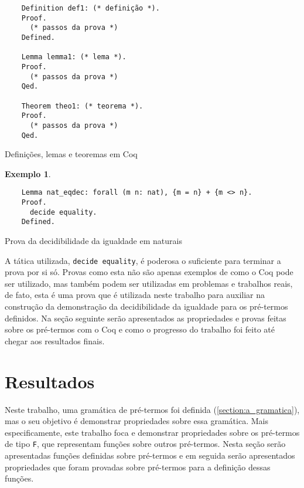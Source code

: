 \documentclass{article}
\newenvironment{codigo}{\captionsetup{type=listing}}{}
\newtheorem{exemplo}{Exemplo}
\begin{document}
\begin{codigo}
\begin{verbatim}
	Definition def1: (* definição *).
	Proof.
	  (* passos da prova *)
	Defined.

	Lemma lemma1: (* lema *).
	Proof.
	  (* passos da prova *)
	Qed.

	Theorem theo1: (* teorema *).
	Proof.
	  (* passos da prova *)
	Qed.
\end{verbatim}
\caption{Definições, lemas e teoremas em Coq}
\label{codigo:provas}
\end{codigo}

\begin{exemplo}
	\label{exemplo:decidibilidade_naturais}
\end{exemplo}
\begin{codigo}
\begin{verbatim}
	Lemma nat_eqdec: forall (m n: nat), {m = n} + {m <> n}.
	Proof.
	  decide equality.
	Defined.
\end{verbatim}
\caption{Prova da decidibilidade da igualdade em naturais}
\label{codigo:decidibilidade_naturais}
\end{codigo}

A tática utilizada, \texttt{decide equality}, é poderosa o suficiente para terminar a prova por si só.  Provas como esta não são apenas exemplos de como o Coq pode ser utilizado, mas também podem ser utilizadas em problemas e trabalhos reais, de fato, esta é uma prova que é utilizada neste trabalho para auxiliar na construção da demonstração da decidibilidade da igualdade para os pré-termos definidos. Na seção seguinte serão apresentados as propriedades e provas feitas sobre os pré-termos com o Coq e como o progresso do trabalho foi feito até chegar aos resultados finais.

\section{Resultados}
\label{section:resultados}

Neste trabalho, uma gramática de pré-termos foi definida (\ref{section:a_gramatica}), mas o seu objetivo é demonstrar propriedades sobre essa gramática. Mais especificamente, este trabalho foca e demonstrar propriedades sobre os pré-termos de tipo \texttt{F}, que representam funções sobre outros pré-termos. Nesta seção serão apresentadas funções definidas sobre pré-termos e em seguida serão apresentados propriedades que foram provadas sobre pré-termos para a definição dessas funções.
\end{document}
